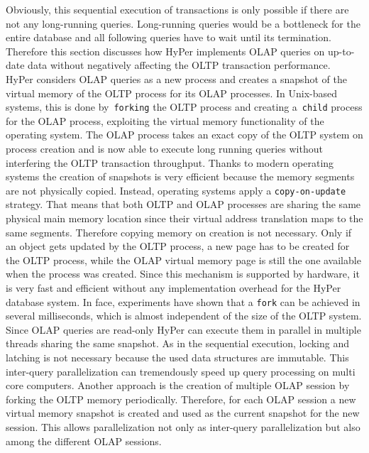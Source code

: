 Obviously, this sequential execution of transactions is only possible if there are not any long-running queries. Long-running queries would be a bottleneck for the entire database and all following queries have to wait until its termination. Therefore this section discusses how HyPer implements OLAP queries on up-to-date data without negatively affecting the OLTP transaction performance. 
\\
HyPer considers OLAP queries as a new process and creates a snapshot of the virtual memory of the OLTP process for its OLAP processes. In Unix-based systems, this is done by~\texttt{forking} the OLTP process and creating a~\texttt{child} process for the OLAP process, exploiting the virtual memory functionality of the operating system. The OLAP process takes an exact copy of the OLTP system on process creation and is now able to execute long running queries without interfering the OLTP transaction throughput. Thanks to modern operating systems the creation of snapshots is very efficient because the memory segments are not physically copied. Instead, operating systems apply a \texttt{copy-on-update} strategy. That means that both OLTP and OLAP processes are sharing the same physical main memory location since their virtual address translation maps to the same segments. Therefore copying memory on creation is not necessary. Only if an object gets updated by the OLTP process, a new page has to be created for the OLTP process, while the OLAP virtual memory page is still the one available when the process was created. Since this mechanism is supported by hardware, it is very fast and efficient without any implementation overhead for the HyPer database system. In face, experiments have shown that a \texttt{fork} can be achieved in several milliseconds, which is almost independent of the size of the OLTP system.
\\
Since OLAP queries are read-only HyPer can execute them in parallel in multiple threads sharing the same snapshot. As in the sequential execution, locking and latching is not necessary because the used data structures are immutable. This inter-query parallelization can tremendously speed up query processing on multi core computers. Another approach is the creation of multiple OLAP session by forking the OLTP memory periodically. Therefore, for each OLAP session a new virtual memory snapshot is created and used as the current snapshot for the new session. This allows parallelization not only as inter-query parallelization but also among the different OLAP sessions.
\\ 
